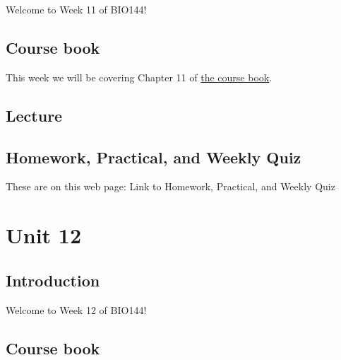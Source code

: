 \documentclass[
  letterpaper,
  8pt,
  a4paper]{book}
\begin{document}

Welcome to Week 11 of BIO144!

\section*{Course book}\label{course-book-10}


This week we will be covering Chapter 11 of
\href{https://opetchey.github.io/BIO144_Course_Book/}{the course book}.

\section*{Lecture}\label{lecture-10}


\section*{Homework, Practical, and Weekly
Quiz}\label{homework-practical-and-weekly-quiz-10}


These are on this web page: Link to Homework, Practical, and Weekly Quiz


\chapter*{Unit 12}\label{unit-12}


\section*{Introduction}\label{introduction-12}


Welcome to Week 12 of BIO144!

\section*{Course book}\label{course-book-11}
\end{document}
